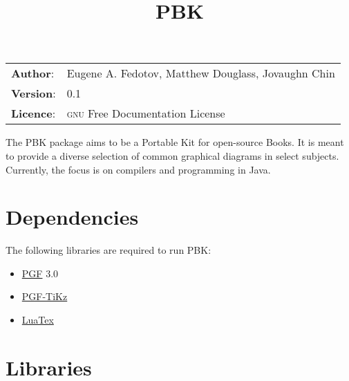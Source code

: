 \documentclass[10pt,a4paper,english]{article}
\title{PBK}
\author{}
\date{}
\newlength{\docinfowidth}
\newlength{\locallinewidth}
\begin{document}
\maketitle
\begin{center}
\begin{tabularx}{\docinfowidth}{lX}
\textbf{Author}: &
	Eugene A. Fedotov, Matthew Douglass, Jovaughn Chin \\
\textbf{Version}: &
	0.1 \\
\textbf{Licence}: &
	\textsc{gnu} Free
	Documentation License \\
\end{tabularx}
\end{center}

\setlength{\locallinewidth}{\linewidth}


The PBK package aims to be a Portable Kit for open-source Books. It is meant to provide a diverse selection of common graphical diagrams in select subjects. Currently, the focus is on compilers and programming in Java.



\section*{Dependencies}
\label{dependencies}

The following libraries are required to run PBK:
\begin{itemize}
\item {} 
\href{https://www.ctan.org/pkg/pgf}{PGF} 3.0
\item {} 
\href{http://www.ctan.org/topic/pgf-tikz}{PGF-TiKz}
\item {} 
\href{https://ctan.org/pkg/luatex}{LuaTex}
\end{itemize}



\section*{Libraries}
\label{libraries}



\end{document}
